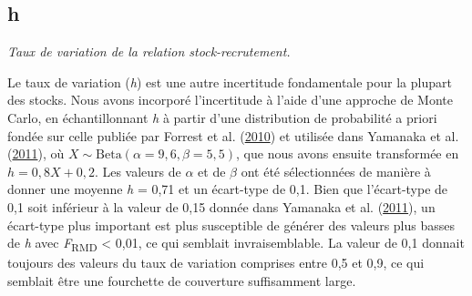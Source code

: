\documentclass[french,11pt]{book}
\begin{document}
\subsection{h}
\label{app:desc-stock-h-yelloweye}

\emph{Taux de variation de la relation stock-recrutement.}

Le taux de variation (\emph{h}) est une autre incertitude fondamentale pour la plupart des stocks. Nous avons incorporé l'incertitude à l'aide d'une approche de Monte Carlo, en échantillonnant \emph{h} à partir d'une distribution de probabilité a priori fondée sur celle publiée par Forrest et al. (\protect\hyperlink{ref-forrest2010}{2010}) et utilisée dans Yamanaka et al. (\protect\hyperlink{ref-yamanaka2011}{2011}), où \(X \sim \textrm{Beta}(\alpha = 9,6, \beta = 5,5)\), que nous avons ensuite transformée en \(h = 0,8 X + 0,2\). Les valeurs de \(\alpha\) et de \(\beta\) ont été sélectionnées de manière à donner une moyenne \emph{h} = 0,71 et un écart-type de 0,1. Bien que l'écart-type de 0,1 soit inférieur à la valeur de 0,15 donnée dans Yamanaka et al. (\protect\hyperlink{ref-yamanaka2011}{2011}), un écart-type plus important est plus susceptible de générer des valeurs plus basses de \emph{h} avec \emph{F}\textsubscript{RMD} \textless{} 0,01, ce qui semblait invraisemblable. La valeur de 0,1 donnait toujours des valeurs du taux de variation comprises entre 0,5 et 0,9, ce qui semblait être une fourchette de couverture suffisamment large.
\end{document}
